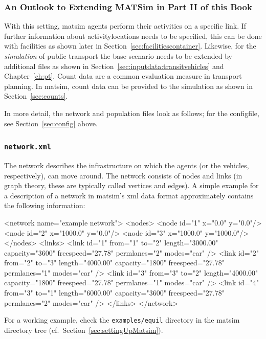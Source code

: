 \subsubsection{An Outlook to Extending MATSim in Part II of this Book}
With this setting, \gls{matsim} agents perform their activities on a specific \gls{link}. If further information about \glspl{activitylocation} needs to be specified, this can be done with facilities as shown later in Section~\ref{sec:facilitiescontainer}. Likewise, for the \emph{simulation} of public transport the base scenario needs to be extended by additional files as shown in Section~\ref{sec:inputdata:transitvehicles} and Chapter~\ref{ch:pt}. Count data are a common evaluation measure in transport planning. In \gls{matsim}, count data can be provided to the simulation as shown in Section~\ref{sec:counts}.
 
In more detail, the network and population files look as follows; for the \gls{configfile}, see Section~\ref{sec:config} above.

\makeatletter
\newcommand\thefontsize{{The current font size is: \f@size pt\par}}
\makeatother

\subsubsection{\lstinline{network.xml}}
\label{sec:lgstartednetwork}
The network describes the infrastructure on which the agents (or the vehicles, respectively), can move around. The network consists of \glspl{node} and \glspl{link} (in graph theory, these are typically called vertices and edges). A simple example for a description of a network in \gls{matsim}'s \gls{xml} data format 
approximately contains the following information:
\begin{xml}
<network name="example network"> 
   <nodes> 
      <node id="1" x="0.0" y="0.0"/> 
      <node id="2" x="1000.0" y="0.0"/> 
      <node id="3" x="1000.0" y="1000.0"/> 
   </nodes> 
   <links> 
      <link id="1" from="1" to="2" length="3000.00" capacity="3600" 
            freespeed="27.78" permlanes="2" modes="car" /> 
      <link id="2" from="2" to="3" length="4000.00" capacity="1800" 
            freespeed="27.78" permlanes="1" modes="car" /> 
      <link id="3" from="3" to="2" length="4000.00" capacity="1800" 
            freespeed="27.78" permlanes="1" modes="car" /> 
      <link id="4" from="3" to="1" length="6000.00" capacity="3600" 
            freespeed="27.78" permlanes="2" modes="car" /> 
   </links> 
</network>
\end{xml}
For a working example, check the \lstinline{examples/equil} directory in the \gls{matsim} directory tree (cf.\ Section~\ref{sec:settingUpMatsim}).

